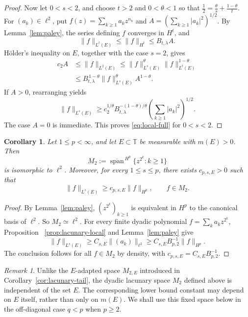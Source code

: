 \documentclass[11pt, reqno]{amsart}
\newtheorem{corollary}[theorem]{Corollary}
\theoremstyle{definition}
\theoremstyle{remark}
\newtheorem{remark}[theorem]{Remark}
\newcommand{\T}{\mathbb{T}}
\begin{document}
\begin{proof}
Now let \(0<s<2\), and choose \(t>2\) and \(0<\theta<1\) so that
\(\frac{1}{2}=\frac{\theta}{s}+\frac{1-\theta}{t}\). For \((a_k)\in\ell^2\), put
\(f(z)=\sum_{k\ge1}a_kz^{n_k}\) and
\(A=(\sum_{k\ge1}|a_k|^2)^{1/2}\). By
Lemma~\ref{lem:paley}, the series defining \(f\) converges in
\(H^t\), and
\[
        \|f\|_{L^t(E)}
        \le
        \|f\|_{H^t}
        \le
        B_{t,\lambda}A.
\]
H\"older's inequality on \(E\), together with the case \(s=2\), gives
\[
\begin{aligned}
        c_2A
        &\le
        \|f\|_{L^2(E)} 
        \le
        \|f\|_{L^s(E)}^\theta
        \|f\|_{L^t(E)}^{1-\theta} \\
        &\le
        B_{t,\lambda}^{\,1-\theta}
        \|f\|_{L^s(E)}^\theta A^{1-\theta}.
\end{aligned}
\]
If \(A>0\), rearranging yields
\[
        \|f\|_{L^s(E)}
        \ge
        c_2^{1/\theta}
        B_{t,\lambda}^{-(1-\theta)/\theta}
        \left(\sum_{k\ge1}|a_k|^2\right)^{1/2}.
\]
The case \(A=0\) is immediate. This proves
\eqref{eq:local-full} for \(0<s<2\). 
\end{proof}


\begin{corollary}
\label{cor:lacunary-set}
Let \(1\le p<\infty\), and let \(E\subset\T\) be measurable with
\(m(E)>0\). Then
\[
        M_2
        :=
        \overline{\operatorname{span}}^{\,H^p}
        \{z^{2^k}:k\ge1\}
\]
is isomorphic to \(\ell^2\). Moreover, for every \(1\le s\le p\),
there exists \(c_{p,s,E}>0\) such that
\[
        \|f\|_{L^s(E)}
        \ge
        c_{p,s,E}\|f\|_{H^p},
        \qquad
        f\in M_2.
\]
\end{corollary}

\begin{proof}
By Lemma~\ref{lem:paley},
\((z^{2^k})_{k\ge1}\) is equivalent in \(H^p\) to the canonical basis
of \(\ell^2\). So \(M_2\simeq\ell^2\).  For every finite dyadic
polynomial \(f=\sum_k a_kz^{2^k}\), Proposition~
\ref{prop:lacunary-local} and
Lemma~\ref{lem:paley} give
\[
        \|f\|_{L^s(E)}
        \ge
        C_{s,E}\|(a_k)\|_{\ell^2}
        \ge
        C_{s,E}B_{p,2}^{-1}\|f\|_{H^p}.
\]
The conclusion follows for all \(f\in M_2\) by density, with
\(c_{p,s,E}=C_{s,E}B_{p,2}^{-1}\).
\end{proof}


\begin{remark}
Unlike the \(E\)-adapted space \(M_{2,E}\) introduced in
Corollary~\ref{cor:lacunary-tail}, the dyadic lacunary
space \(M_2\) defined above is independent of the set \(E\). The
corresponding lower bound constant may depend on \(E\) itself, rather
than only on \(m(E)\). We shall use this fixed space below in the
off-diagonal case \(q<p\) when \(p\ge2\).
\end{remark}
\end{document}
